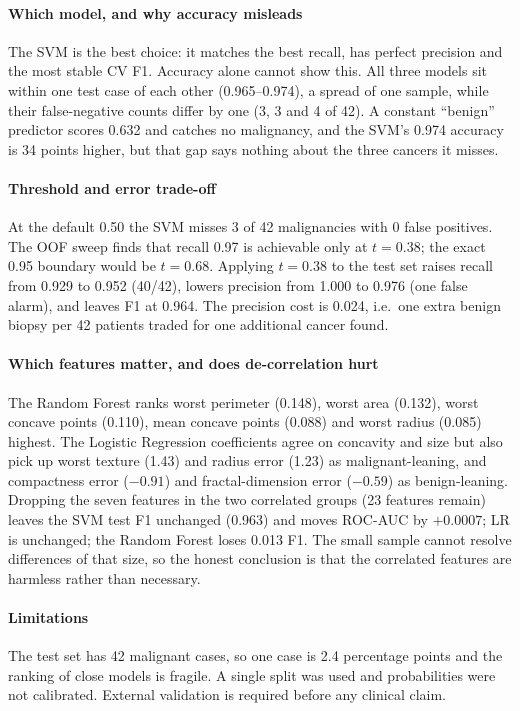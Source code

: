 \documentclass[10pt,journal,a4paper]{IEEEtran}
\begin{document}
\paragraph{Which model, and why accuracy misleads}
The SVM is the best choice: it matches the best recall, has perfect precision
and the most stable CV F1. Accuracy alone cannot show this. All three models sit
within one test case of each other (0.965--0.974), a spread of one sample, while
their false-negative counts differ by one (3, 3 and 4 of 42). A constant
``benign'' predictor scores 0.632 and catches no malignancy, and the SVM's
0.974 accuracy is 34 points higher, but that gap says nothing about the three
cancers it misses.

\paragraph{Threshold and error trade-off}
At the default 0.50 the SVM misses 3 of 42 malignancies with 0 false positives.
The OOF sweep finds that recall 0.97 is achievable only at $t=0.38$; the exact
0.95 boundary would be $t=0.68$. Applying $t=0.38$ to the test set raises recall
from 0.929 to 0.952 (40/42), lowers precision from 1.000 to 0.976 (one false
alarm), and leaves F1 at 0.964. The precision cost is 0.024, i.e.\ one extra benign
biopsy per 42 patients traded for one additional cancer found.

\paragraph{Which features matter, and does de-correlation hurt}
The Random Forest ranks worst perimeter (0.148), worst area (0.132), worst
concave points (0.110), mean concave points (0.088) and worst radius (0.085)
highest. The Logistic Regression coefficients agree on concavity and size but
also pick up worst texture (1.43) and radius error (1.23) as malignant-leaning,
and compactness error ($-0.91$) and fractal-dimension error ($-0.59$) as
benign-leaning. Dropping the seven features in the two correlated groups (23
features remain) leaves the SVM test F1 unchanged (0.963) and moves ROC-AUC by
$+0.0007$; LR is unchanged; the Random Forest loses 0.013 F1. The small
sample cannot resolve differences of that size, so the honest conclusion is that
the correlated features are harmless rather than necessary.

\paragraph{Limitations}
The test set has 42 malignant cases, so one case is 2.4 percentage points and
the ranking of close models is fragile. A single split was used and probabilities
were not calibrated. External validation is required before any clinical claim.
\end{document}
